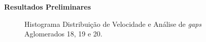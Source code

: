 \documentclass[xcolor=dvipsnames,10pt]{beamer}
\begin{document}
\begin{frame}{\textbf{Resultados Preliminares}}
\begin{figure}[!htbp]
    \caption{Histograma Distribuição de Velocidade e Análise de \textit{gaps} Aglomerados 18, 19 e 20.}
  \end{figure}
\end{frame}
\end{document}
